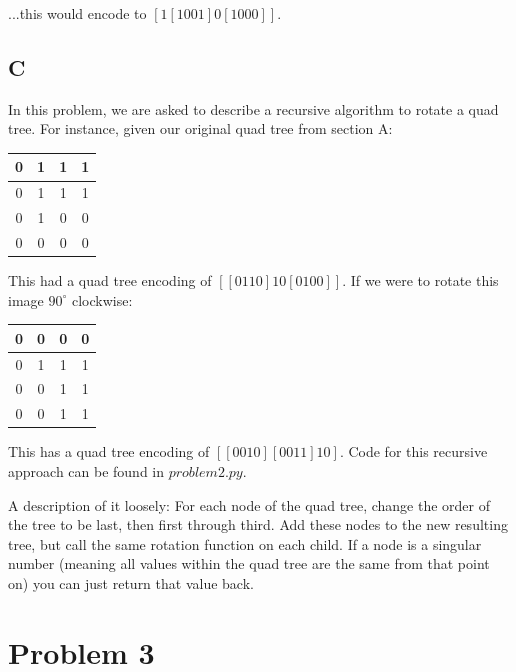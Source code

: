 \documentclass{article}
\begin{document}
\noindent ...this would encode to $[1[1001]0[1000]]$.

\subsection*{C}

In this problem, we are asked to describe a recursive algorithm to rotate a quad tree. For instance, given our original quad tree from section A:

\begin{center}
    \begin{tabular}{ | c | c | c | c | }
        \hline
        0 & 1 & 1 & 1 \\ 
        \hline
        0 & 1 & 1 & 1 \\ 
        \hline
        0 & 1 & 0 & 0 \\ 
        \hline
        0 & 0 & 0 & 0 \\ 
        \hline  
    \end{tabular}
\end{center}

\noindent This had a quad tree encoding of $[[0110]10[0100]]$. If we were to rotate this image $90^\circ$ clockwise:

\begin{center}
    \begin{tabular}{ | c | c | c | c | }
        \hline
        0 & 0 & 0 & 0 \\ 
        \hline
        0 & 1 & 1 & 1 \\
        \hline
        0 & 0 & 1 & 1 \\
        \hline
        0 & 0 & 1 & 1 \\
        \hline
    \end{tabular}
\end{center}

\noindent This has a quad tree encoding of $[[0010][0011]10]$. Code for this recursive approach can be found in $problem2.py$.

A description of it loosely: For each node of the quad tree, change the order of the tree to be last, then first through third. Add these nodes to the new resulting tree, but call the same rotation function on each child. If a node is a singular number (meaning all values within the quad tree are the same from that point on) you can just return that value back.

\section*{Problem 3}
\end{document}
